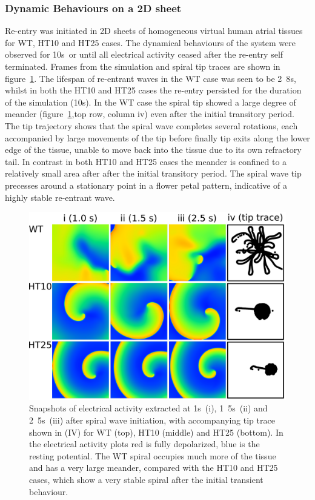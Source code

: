 \subsubsection{Dynamic Behaviours on a 2D sheet}

Re-entry was initiated in 2D sheets of homogeneous virtual human atrial tissues
for WT, HT10 and HT25 cases.
The dynamical behaviours of the system were observed for \unit{10}{s}\ or until
all electrical activity ceased after the re-entry self terminated.
Frames from the simulation and spiral tip traces are shown in
figure~\ref{atrium:iks:twodframes}.
The lifespan of re-entrant waves in the WT case was seen to be \unit{2.8}{s},
whilst in both the HT10 and HT25 cases the re-entry persisted for the duration
of the simulation (\unit{10}{s}).
In the WT case the spiral tip showed a large degree of meander
(figure~\ref{atrium:iks:twodframes},top row, column iv) even after the initial
transitory period.
The tip trajectory shows that the spiral wave completes several rotations, each
accompanied by large movements of the tip before finally tip exits along the
lower edge of the tissue, unable to move back into the tissue due to its own
refractory tail.
In contrast in both HT10 and HT25 cases the meander is confined to a relatively
small area after after the initial transitory period.
The spiral wave tip precesses around a stationary point in a flower petal
pattern, indicative of a highly stable re-entrant wave.

\begin{figure}
\includegraphics{figures/atrium/iks/2Dplots}
\caption[2D Re-entry under S140G conditions]{
\label{atrium:iks:twodframes}
Snapshots of electrical activity extracted at \unit{1}{s}\ (i), \unit{1.5}{s}\
(ii) and \unit{2.5}{s}\ (iii) after spiral wave initiation, with accompanying
tip trace shown in (IV) for WT (top), HT10 (middle) and HT25 (bottom).  In the
electrical activity plots red is fully depolarized, blue is the resting
potential.  The WT spiral occupies much more of the tissue and has a very large
meander, compared with the HT10 and HT25 cases, which show a very stable spiral
after the initial transient behaviour.
}
\end{figure}

